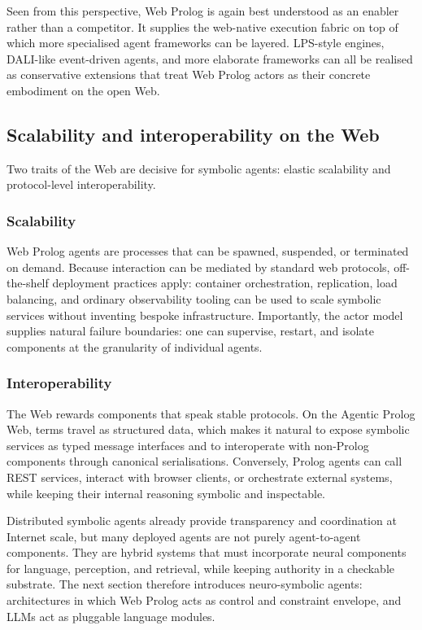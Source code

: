 Seen from this perspective, Web Prolog is again best understood as an enabler rather than a competitor. It supplies the web-native execution fabric on top of which more specialised agent frameworks can be layered. LPS-style engines, DALI-like event-driven agents, and more elaborate frameworks can all be realised as conservative extensions that treat Web Prolog actors as their concrete embodiment on the open Web.

\subsection{Scalability and interoperability on the Web}
\label{sec:scalability-and-interoperability}

Two traits of the Web are decisive for symbolic agents: elastic scalability and protocol-level interoperability.

\subsubsection{Scalability}

Web Prolog agents are processes that can be spawned, suspended, or terminated on demand. Because interaction can be mediated by standard web protocols, off-the-shelf deployment practices apply: container orchestration, replication, load balancing, and ordinary observability tooling can be used to scale symbolic services without inventing bespoke infrastructure. Importantly, the actor model supplies natural failure boundaries: one can supervise, restart, and isolate components at the granularity of individual agents.

\subsubsection{Interoperability}

The Web rewards components that speak stable protocols. On the Agentic Prolog Web, terms travel as structured data, which makes it natural to expose symbolic services as typed message interfaces and to interoperate with non-Prolog components through canonical serialisations. Conversely, Prolog agents can call REST services, interact with browser clients, or orchestrate external systems, while keeping their internal reasoning symbolic and inspectable.

\medskip

\noindent Distributed symbolic agents already provide transparency and coordination at Internet scale, but many deployed agents are not purely agent-to-agent components. They are hybrid systems that must incorporate neural components for language, perception, and retrieval, while keeping authority in a checkable substrate. The next section therefore introduces neuro-symbolic agents: architectures in which Web Prolog acts as control and constraint envelope, and LLMs act as pluggable language modules.


